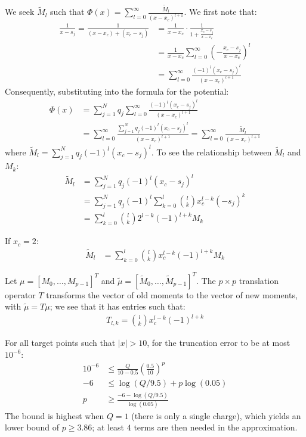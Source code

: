 \documentclass{article}
\begin{document}
We seek $\tilde{M}_l$ such that $\Phi(x) = \sum_{l=0}^\infty \frac{\tilde{M}_l}{(x - x_c)^{l + 1}}$. We first note that:
\begin{align*}
    \frac{1}{x - s_j} = \frac{1}{(x - x_c) + (x_c - s_j)} & = \frac{1}{x - x_c} \cdot \frac{1}{1 + \frac{x_c - s_j}{x - x_c}} \\
    & = \frac{1}{x - x_c}\sum_{l=0}^{\infty} \left(-\frac{x_c - s_j}{x - x_c}\right)^l \\
    & = \sum_{l=0}^{\infty} \frac{(-1)^l(x_c - s_j)^l}{(x - x_c)^{l+1}}
\end{align*}
Consequently, substituting into the formula for the potential:
\begin{align*}
    \Phi(x) & = \sum_{j=1}^N q_j \sum_{l=0}^{\infty} \frac{(-1)^l(x_c - s_j)^l}{(x - x_c)^{l+1}} \\
    & = \sum_{l=0}^{\infty} \frac{\sum_{j=1}^N q_j (-1)^l(x_c - s_j)^l}{(x - x_c)^{l+1}} = \sum_{l=0}^{\infty} \frac{\tilde{M}_l}{(x - x_c)^{l+1}}
\end{align*}
where $\tilde{M}_l = \sum_{j=1}^N q_j (-1)^l(x_c - s_j)^l$. To see the relationship between $\tilde{M}_l$ and $M_k$:
\begin{align*}
    \tilde{M}_l & = \sum_{j=1}^N q_j (-1)^l(x_c - s_j)^l \\
    & = \sum_{j=1}^N q_j (-1)^l\sum_{k=0}^l {l \choose k}x_c^{l-k}(-s_j)^k \\
    & = \sum_{k=0}^l {l \choose k}2^{l-k}(-1)^{l+k} M_k
\end{align*}

If $x_c = 2$:
\begin{align*}
    \tilde{M}_l & = \sum_{k=0}^l {l \choose k}x_c^{l-k}(-1)^{l+k} M_k
\end{align*}

Let $\mu = [M_0, \ldots, M_{p-1}]^T$ and $\tilde{\mu} = [\tilde{M}_0, \ldots, \tilde{M}_{p-1}]^T$. The $p \times p$ translation operator $T$ transforms the vector of old moments to the vector of new moments, with $\tilde{\mu} = T\mu$; we see that it has entries such that:
\begin{align*}
    T_{l,k} = {l \choose k}x_c^{l-k}(-1)^{l+k}
\end{align*}

For all target points such that $|x| > 10$, for the truncation error to be at most $10^{-6}$:
\begin{align*}
    10^{-6} & \leq \frac{Q}{10 - 0.5}\left(\frac{0.5}{10}\right)^p \\
    -6 & \leq \log(Q/9.5) + p\log(0.05) \\
    p & \geq \frac{-6 - \log(Q/9.5)}{\log(0.05)}
\end{align*}
The bound is highest when $Q = 1$ (there is only a single charge), which yields an lower bound of $p \geq 3.86$; at least $4$ terms are then needed in the approximation.
\end{document}
